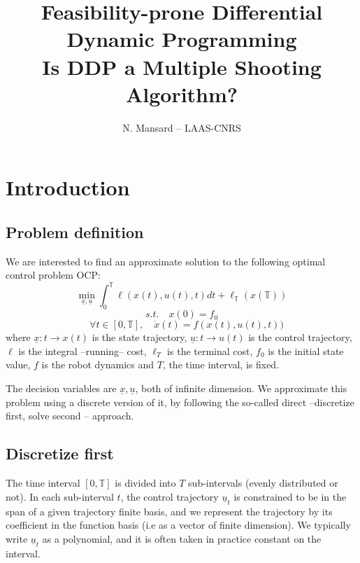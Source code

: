 \documentclass[10pt,a4paper]{article}
\begin{document}
\title{Feasibility-prone Differential Dynamic Programming \\
Is DDP a Multiple Shooting Algorithm?}
\author{N. Mansard -- LAAS-CNRS}

\maketitle


\newcommand{\xtraj}{\underline{x}}
\newcommand{\utraj}{\underline{u}}
\newcommand{\lambdatraj}{\underline{\lambda}}
\newcommand{\dxtraj}{\underline{\Delta x}}
\newcommand{\dutraj}{\underline{\Delta u}}
\newcommand{\dxtrajguess}{\underline{\Delta \bar x}}
\newcommand{\dutrajguess}{\underline{\Delta \bar u}}
\newcommand{\dx}{\Delta x}
\newcommand{\du}{\Delta u}
\newcommand{\Treal}{\mathbb{T}}
\newcommand{\bmat}{\begin{bmatrix}}
\newcommand{\emat}{\end{bmatrix}}
\newcommand{\qed}{\hfill$\square$}

\section{Introduction}

\subsection{Problem definition}
We are interested to find an approximate solution to the following optimal control problem OCP:
$$\min_{\xtraj,\utraj} \int_0^\Treal \ell(x(t),u(t),t) dt + \ell_\Treal(x(\Treal))$$
$$s.t. \quad x(0) = f_0$$
$$\quad \forall t \in [0,\Treal], \quad \dot{x}(t) = f(x(t),u(t),t))$$
where $\xtraj: t \rightarrow x(t)$ is the state trajectory, $\utraj: t \rightarrow u(t)$ is the control trajectory, $\ell$ is the integral --running-- cost, $\ell_T$ is the terminal cost, $f_0$ is the initial state value, $f$ is the robot dynamics and $T$, the time interval, is fixed.

The decision variables are $\xtraj,\utraj$, both of infinite dimension. 
We approximate this problem using a discrete version of it, by following the so-called direct --discretize first, solve second -- approach.

\subsection{Discretize first}
The time interval $[0,\Treal]$ is divided into $T$ sub-intervals (evenly distributed or not).
In each sub-interval $t$, the control trajectory $\utraj_t$ is constrained to be in the span of a given trajectory finite basis, and we represent the trajectory by its coefficient in the function basis (i.e as a vector of finite dimension). We typically write $\utraj_t$ as a polynomial, and it is often taken in practice constant on the interval.
\end{document}
